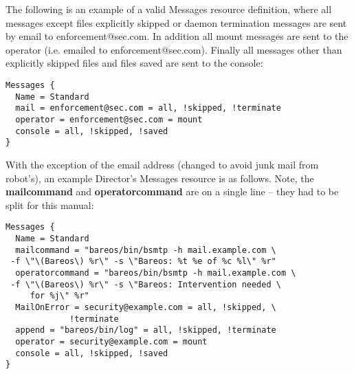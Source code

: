 The following is an example of a valid Messages resource definition, where
all messages except files explicitly skipped or daemon termination messages
are sent by email to enforcement@sec.com.  In addition all mount messages
are sent to the operator (i.e.  emailed to enforcement@sec.com).  Finally
all messages other than explicitly skipped files and files saved are sent
to the console:

\footnotesize
\begin{verbatim}
Messages {
  Name = Standard
  mail = enforcement@sec.com = all, !skipped, !terminate
  operator = enforcement@sec.com = mount
  console = all, !skipped, !saved
}
\end{verbatim}
\normalsize

With the exception of the email address (changed to avoid junk mail from
robot's), an example Director's Messages resource is as follows. Note, the {\bf
mailcommand} and {\bf operatorcommand} are on a single line -- they had to be
split for this manual:

\footnotesize
\begin{verbatim}
Messages {
  Name = Standard
  mailcommand = "bareos/bin/bsmtp -h mail.example.com \
 -f \"\(Bareos\) %r\" -s \"Bareos: %t %e of %c %l\" %r"
  operatorcommand = "bareos/bin/bsmtp -h mail.example.com \
 -f \"\(Bareos\) %r\" -s \"Bareos: Intervention needed \
     for %j\" %r"
  MailOnError = security@example.com = all, !skipped, \
             !terminate
  append = "bareos/bin/log" = all, !skipped, !terminate
  operator = security@example.com = mount
  console = all, !skipped, !saved
}
\end{verbatim}
\normalsize
